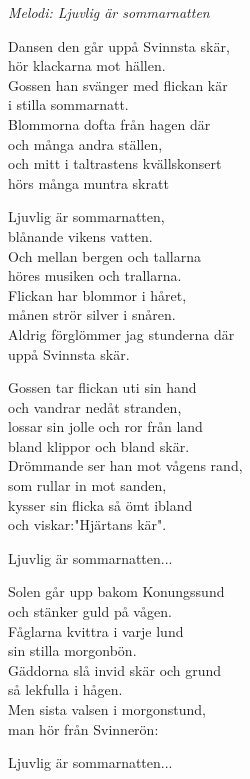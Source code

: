 {\footnotesize\textit{Melodi: Ljuvlig är sommarnatten}}\par
\vspace{10pt}
Dansen den går uppå Svinnsta skär,\\
hör klackarna mot hällen.\\
Gossen han svänger med flickan kär\\
i stilla sommarnatt.\\
Blommorna dofta från hagen där\\
och många andra ställen,\\
och mitt i taltrastens kvällskonsert\\
hörs många muntra skratt\par
\vspace{10pt}
Ljuvlig är sommarnatten,\\
blånande vikens vatten.\\
Och mellan bergen och tallarna\\
höres musiken och trallarna.\\
Flickan har blommor i håret,\\
månen strör silver i snåren.\\
Aldrig förglömmer jag stunderna där\\
uppå Svinnsta skär.\par
\vspace{10pt}
Gossen tar flickan uti sin hand\\
och vandrar nedåt stranden,\\
lossar sin jolle och ror från land\\
bland klippor och bland skär.\\
Drömmande ser han mot vågens rand,\\
som rullar in mot sanden,\\
kysser sin flicka så ömt ibland\\
och viskar:"Hjärtans kär".\par
\vspace{10pt}
Ljuvlig är sommarnatten...\par
\vspace{10pt}
Solen går upp bakom Konungssund\\
och stänker guld på vågen.\\
Fåglarna kvittra i varje lund\\
sin stilla morgonbön.\\
Gäddorna slå invid skär och grund\\
så lekfulla i hågen.\\
Men sista valsen i morgonstund,\\
man hör från Svinnerön:\par
\vspace{10pt}
Ljuvlig är sommarnatten...
